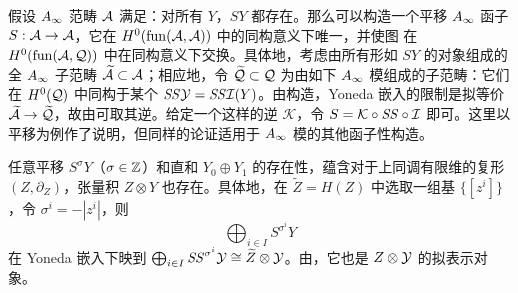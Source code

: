 假设 $A_\infty$ 范畴 $\mathcal A$ 满足：对所有 $Y$，$SY$ 都存在。那么可以构造一个平移 $A_\infty$ 函子 $S:\mathcal A\to\mathcal A$，它在 $H^0(\operatorname{fun}(\mathcal A,\mathcal A))$ 中的同构意义下唯一，并使图
在 $H^0(\operatorname{fun}(\mathcal A,\mathcal Q))$ 中在同构意义下交换。具体地，考虑由所有形如 $SY$ 的对象组成的全 $A_\infty$ 子范畴 $\widetilde{\mathcal A}\subset\mathcal A$；相应地，令 $\widetilde{\mathcal Q}\subset\mathcal Q$ 为由如下 $A_\infty$ 模组成的子范畴：它们在 $H^0(\mathcal Q)$ 中同构于某个 $\mathit{SS}\mathcal Y=\mathit{SS}\mathcal I(Y)$。由构造，Yoneda 嵌入的限制是拟等价 $\widetilde{\mathcal A}\to\widetilde{\mathcal Q}$，故由可取其逆。给定一个这样的逆 $\mathcal K$，令 $S=\mathcal K\circ\mathit{SS}\circ\mathcal I$ 即可。这里以平移为例作了说明，但同样的论证适用于 $A_\infty$ 模的其他函子性构造。

\begin{note}\label{st:3.4}
任意平移 $S^{\sigma} Y$（$\sigma\in\mathbb Z$）和直和 $Y_0\oplus Y_1$ 的存在性，蕴含对于上同调有限维的复形 $(Z,\partial_Z)$，张量积 $Z\otimes Y$ 也存在。具体地，在 $\widetilde Z=H(Z)$ 中选取一组基 $\{[z^i]\}$，令 $\sigma^i=-|z^i|$，则
\[
\bigoplus_{i\in I}S^{\sigma^i}Y
\]
在 Yoneda 嵌入下映到 $\bigoplus_{i\in I}\mathit{SS}^{\sigma^i}\mathcal Y\cong\widetilde Z\otimes\mathcal Y$。由，它也是 $Z\otimes\mathcal Y$ 的拟表示对象。
\end{note}
